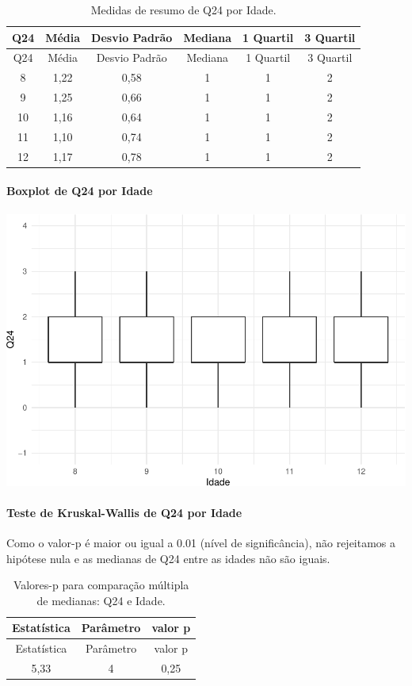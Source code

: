 \documentclass[]{article}
\let\oldparagraph\paragraph
\renewcommand{\paragraph}[1]{\oldparagraph{#1}\mbox{}}
\begin{document}
\begin{longtable}[]{@{}cccccc@{}}
\caption{\label{tab:unnamed-chunk-626}Medidas de resumo de Q24 por Idade.}\tabularnewline
\toprule
Q24 & Média & Desvio Padrão & Mediana & 1 Quartil & 3 Quartil\tabularnewline
\midrule
\endfirsthead
\toprule
Q24 & Média & Desvio Padrão & Mediana & 1 Quartil & 3 Quartil\tabularnewline
\midrule
\endhead
8 & 1,22 & 0,58 & 1 & 1 & 2\tabularnewline
9 & 1,25 & 0,66 & 1 & 1 & 2\tabularnewline
10 & 1,16 & 0,64 & 1 & 1 & 2\tabularnewline
11 & 1,10 & 0,74 & 1 & 1 & 2\tabularnewline
12 & 1,17 & 0,78 & 1 & 1 & 2\tabularnewline
\bottomrule
\end{longtable}

\hypertarget{boxplot-de-q24-por-idade}{%
\paragraph{Boxplot de Q24 por Idade}\label{boxplot-de-q24-por-idade}}

\begin{center}\includegraphics[width=0.75\linewidth]{relatorio_covid19_files/figure-latex/unnamed-chunk-627-1} \end{center}

\hypertarget{teste-de-kruskal-wallis-de-q24-por-idade}{%
\paragraph{Teste de Kruskal-Wallis de Q24 por Idade}\label{teste-de-kruskal-wallis-de-q24-por-idade}}

Como o valor-p é maior ou igual a 0.01 (nível de significância), não rejeitamos a hipótese nula e as medianas de Q24 entre as idades não são iguais.

\begin{longtable}[]{@{}ccc@{}}
\caption{\label{tab:unnamed-chunk-629}Valores-p para comparação múltipla de medianas: Q24 e Idade.}\tabularnewline
\toprule
Estatística & Parâmetro & valor p\tabularnewline
\midrule
\endfirsthead
\toprule
Estatística & Parâmetro & valor p\tabularnewline
\midrule
\endhead
5,33 & 4 & 0,25\tabularnewline
\bottomrule
\end{longtable}
\end{document}
